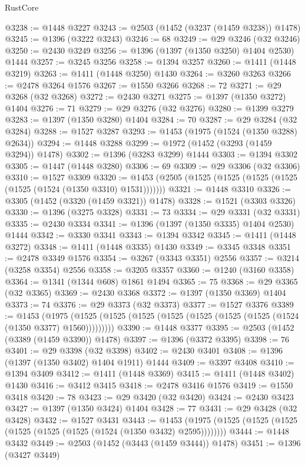 \begin{lexlean}{RustCore}
\begin{coremodule}
{\begin{coremodule}
{{{{{{{{{{{{{{{{{{{{{{{{{{{{{{{{{{{{{{{{{{{{{@3238 := @1448 @3227
@3243 := @2503 (@1452 (@3237 (@1459 @3238)) @1478)
@3245 := @1396 (@3222 @3243)
@3246 := 68
@3249 := @29 @3246 (@32 @3246)
@3250 := @2430 @3249
@3256 := @1396 (@1397 (@1350 @3250) @1404 @2530) @1444
@3257 := @3245 @3256
@3258 := @1394 @3257
@3260 := @1411 (@1448 @3219)
@3263 := @1411 (@1448 @3250) @1430
@3264 := @3260 @3263
@3266 := @2478 @3264 @1576
@3267 := @1550 @3266
@3268 := 72
@3271 := @29 @3268 (@32 @3268)
@3272 := @2430 @3271
@3275 := @1397 (@1350 @3272) @1404
@3276 := 71
@3279 := @29 @3276 (@32 @3276)
@3280 := @1399 @3279
@3283 := @1397 (@1350 @3280) @1404
@3284 := 70
@3287 := @29 @3284 (@32 @3284)
@3288 := @1527 @3287
@3293 := @1453 (@1975 (@1524 (@1350 @3288) @2634))
@3294 := @1448 @3288
@3299 := @1972 (@1452 (@3293 (@1459 @3294)) @1478)
@3302 := @1396 (@3283 @3299) @1444
@3303 := @1394 @3302
@3305 := @1447 (@1448 @3280)
@3306 := 69
@3309 := @29 @3306 (@32 @3306)
@3310 := @1527 @3309
@3320 := @1453 (@2505 (@1525 (@1525 (@1525 (@1525 (@1525 (@1524 (@1350 @3310) @1531)))))))
@3321 := @1448 @3310
@3326 := @3305 (@1452 (@3320 (@1459 @3321)) @1478)
@3328 := @1521 (@3303 @3326)
@3330 := @1396 (@3275 @3328)
@3331 := 73
@3334 := @29 @3331 (@32 @3331)
@3335 := @2430 @3334
@3341 := @1396 (@1397 (@1350 @3335) @1404 @2530) @1444
@3342 := @3330 @3341
@3343 := @1394 @3342
@3345 := @1411 (@1448 @3272)
@3348 := @1411 (@1448 @3335) @1430
@3349 := @3345 @3348
@3351 := @2478 @3349 @1576
@3354 := @3267 (@3343 @3351) @2556
@3357 := @3214 (@3258 @3354) @2556
@3358 := @3205 @3357
@3360 := @1240 (@3160 @3358)
@3364 := @1341 (@1344 @608) @1861 @1494
@3365 := 75
@3368 := @29 @3365 (@32 @3365)
@3369 := @2430 @3368
@3372 := @1397 (@1350 @3369) @1404
@3373 := 74
@3376 := @29 @3373 (@32 @3373)
@3377 := @1527 @3376
@3389 := @1453
    (@1975 (@1525 (@1525 (@1525 (@1525 (@1525 (@1525 (@1525 (@1524 (@1350 @3377) @1560)))))))))
@3390 := @1448 @3377
@3395 := @2503 (@1452 (@3389 (@1459 @3390)) @1478)
@3397 := @1396 (@3372 @3395)
@3398 := 76
@3401 := @29 @3398 (@32 @3398)
@3402 := @2430 @3401
@3408 := @1396 (@1397 (@1350 @3402) @1404 @1911) @1444
@3409 := @3397 @3408
@3410 := @1394 @3409
@3412 := @1411 (@1448 @3369)
@3415 := @1411 (@1448 @3402) @1430
@3416 := @3412 @3415
@3418 := @2478 @3416 @1576
@3419 := @1550 @3418
@3420 := 78
@3423 := @29 @3420 (@32 @3420)
@3424 := @2430 @3423
@3427 := @1397 (@1350 @3424) @1404
@3428 := 77
@3431 := @29 @3428 (@32 @3428)
@3432 := @1527 @3431
@3443 := @1453 (@1975 (@1525 (@1525 (@1525 (@1525 (@1525 (@1525 (@1524 (@1350 @3432) @2595))))))))
@3444 := @1448 @3432
@3449 := @2503 (@1452 (@3443 (@1459 @3444)) @1478)
@3451 := @1396 (@3427 @3449)
}}}}}}}}}}}}}}}}}}}}}}}}}}}}}}}}}}}}}}}}}}}}}
\end{coremodule}}
\end{coremodule}
\end{lexlean}
